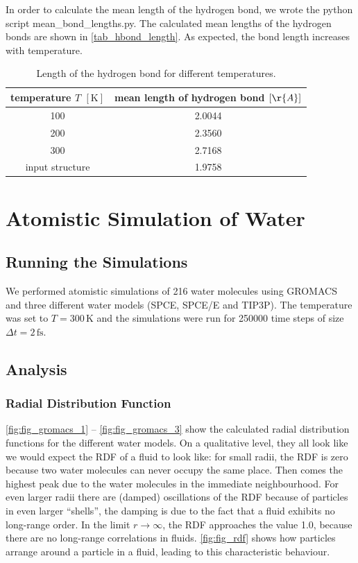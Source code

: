 \documentclass[a4paper,10pt,bibtotoc]{scrartcl}
\begin{document}
\noindent In order to calculate the mean length of the hydrogen bond, we wrote the python script mean\_bond\_lengths.py.
The calculated mean lengths of the hydrogen bonds are shown in \autoref{tab_hbond_length}.
As expected, the bond length increases with temperature.

\begin{table}[h]
\centering
\caption{Length of the hydrogen bond for different temperatures.}
\begin{tabular}{@{}cc@{}}
\toprule
temperature $T$ $\left[\mathrm{K}\right]$ &  mean length of hydrogen bond $\left[\r{A}\right]$\\ \midrule
100  &   2.0044\\
200  &  2.3560 \\
300  &  2.7168\\
input structure & 1.9758
\\\bottomrule
\end{tabular}
\label{tab_hbond_length}
\end{table}


\newpage
\section{Atomistic Simulation of Water}
\subsection{Running the Simulations}
We performed atomistic simulations of 216 water molecules using GROMACS and three different water models (SPCE, SPCE/E and TIP3P). The temperature was set to $T=300\,\mathrm{K}$ and the simulations were run for 250000 time steps of size $\Delta t = 2\,\mathrm{fs}$.

\subsection{Analysis}
\subsubsection*{Radial Distribution Function}
\autoref{fig:fig_gromacs_1} -- \autoref{fig:fig_gromacs_3} show the calculated radial distribution functions for the different water models.
On a qualitative level, they all look like we would expect the RDF of a fluid to look like: for small radii, the RDF is zero because two water molecules can never occupy the same place. 
Then comes the highest peak due to the water molecules in the immediate neighbourhood. 
For even larger radii there are (damped) oscillations of the RDF because of particles in even larger ``shells'', the damping is due to the fact that a fluid exhibits no long-range order. 
In the limit $r\rightarrow \infty$, the RDF approaches the value 1.0, because there are no long-range correlations in fluids.
\autoref{fig:fig_rdf} shows how particles arrange around a particle in a fluid, leading to this characteristic behaviour.
\end{document}
